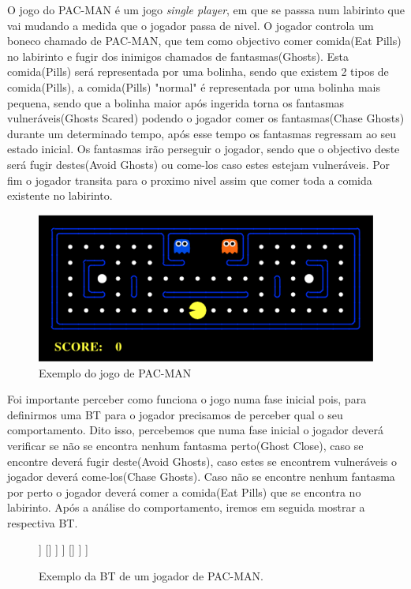 O jogo do PAC-MAN é um jogo \textit{single player}, em que se passsa num labirinto que vai mudando a medida que o jogador passa de nivel. O jogador controla um boneco chamado de PAC-MAN, que tem como objectivo comer comida(Eat Pills) no labirinto e fugir dos inimigos chamados de fantasmas(Ghosts). Esta comida(Pills) será representada por uma bolinha, sendo que existem 2 tipos de comida(Pills), a comida(Pills) "normal" é representada por uma bolinha mais pequena, sendo que a bolinha maior após ingerida torna os fantasmas vulneráveis(Ghosts Scared) podendo o jogador comer os fantasmas(Chase Ghosts) durante um determinado tempo, após esse tempo os fantasmas regressam ao seu estado inicial. Os fantasmas irão perseguir o jogador, sendo que o objectivo deste será fugir destes(Avoid Ghosts) ou come-los caso estes estejam vulneráveis. Por fim o jogador transita para o proximo nivel assim que comer toda a comida existente no labirinto.

\begin{figure}[h!]
\centering
\includegraphics[scale=0.5]{Figures/PACMAN.PNG}
\caption{Exemplo do jogo de PAC-MAN}
\label{fig:traducao}
\end{figure}

Foi importante perceber como funciona o jogo numa fase inicial pois, para definirmos uma BT para o jogador precisamos de perceber qual o seu comportamento. Dito isso, percebemos que numa fase inicial o jogador deverá verificar se não se encontra nenhum fantasma perto(Ghost Close), caso se encontre deverá fugir deste(Avoid Ghosts), caso estes se encontrem vulneráveis o jogador deverá come-los(Chase Ghosts). Caso não se encontre nenhum fantasma por perto o jogador deverá comer a comida(Eat Pills) que se encontra no labirinto. Após a análise do comportamento, iremos em seguida mostrar a respectiva BT.


        \begin{figure}[H]
        \centering
        \begin{behavior}
            [\rootnode
                [\selector
                    [\sequence
                        [\condition{Ghost Close}]
                        [\selector
                            [\sequence
                                [\condition{Ghost Scared}]
                                [\action{Chase Ghost}]
                            ]
                            []
                        ]
                    ]
                    []
                ]
            ]
        \end{behavior}
        \caption{Exemplo da BT de um jogador de PAC-MAN.}
        \label{fig:2.9}
        \end{figure}